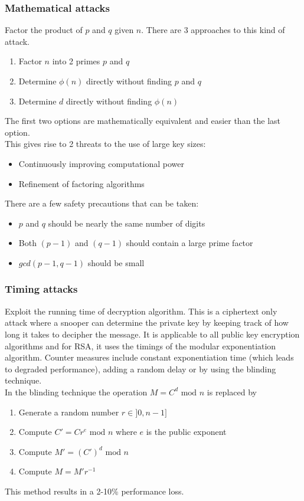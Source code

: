 \documentclass[12pt]{article}
\begin{document}
 \subsubsection{Mathematical attacks}
 Factor the product of $p$ and $q$ given $n$. There are 3 approaches to this kind of attack.
 \begin{enumerate}
 	\item Factor $n$ into 2 primes $p$ and $q$
 	\item Determine $\phi(n)$ directly without finding $p$ and $q$
 	\item Determine $d$ directly without finding $\phi(n)$
 \end{enumerate}
The first two options are mathematically equivalent and easier than the last option.\\
This gives rise to 2 threats to the use of large key sizes:
\begin{itemize}
	\item Continuously improving computational power
	\item Refinement of factoring algorithms
\end{itemize}
There are a few safety precautions that can be taken:
\begin{itemize}
	\item $p$ and $q$ should be nearly the same number of digits
	\item Both $(p-1)$ and $(q-1)$ should contain a large prime factor
	\item $gcd(p-1, q-1)$ should be small
\end{itemize}

 \subsubsection{Timing attacks}
 Exploit the running time of decryption algorithm. This is a ciphertext only attack where a snooper can determine the private key by keeping track of how long it takes to decipher the message. It is applicable to all public key encryption algorithms and for RSA, it uses the timings of the modular exponentiation algorithm. Counter measures include constant exponentiation time (which leads to degraded performance), adding a random delay or by using the blinding technique.\\
 In the blinding technique the operation $M=C^d\text{ mod }n$ is replaced by
 \begin{enumerate}
 	\item Generate a random number $r \in ]0, n-1]$
 	\item Compute $C' =Cr^e \text{ mod }n$ where $e$ is the public exponent
 	\item Compute $M' = (C')^d \text{ mod } n$
 	\item Compute $M = M'r^{-1}$ 
 \end{enumerate}
 This method results in a 2-10\% performance loss.
 
\end{document}
